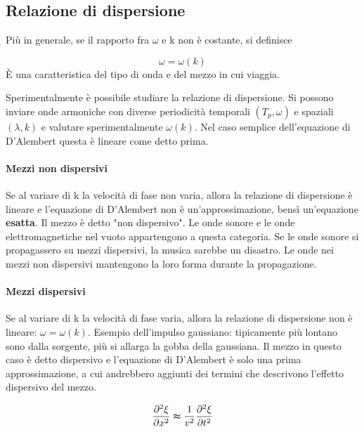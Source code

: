 \subsection{Relazione di dispersione}

Più in generale, se il rapporto fra \(\omega \) e k non è costante, si definisce

\begin{definition}
	\[
		\omega = \omega(k)
	\]
	È una caratteristica del tipo di onda e del mezzo in cui viaggia.
\end{definition}

Sperimentalmente è possibile studiare la relazione di dispersione. Si possono inviare onde armoniche con diverse periodicità temporali \((T_p, \omega )\) e spaziali \((\lambda , k)\) e valutare sperimentalmente \(\omega (k) \). Nel caso semplice dell'equazione di D'Alembert questa è lineare come detto prima.

\paragraph{Mezzi non dispersivi}

Se al variare di k la velocità di fase non varia, allora la relazione di dispersione è lineare e l'equazione di D'Alembert non è un'approssimazione, bensì un'equazione \textbf{esatta}. Il mezzo è detto "non dispersivo". Le onde sonore e le onde elettromagnetiche nel vuoto appartengono a questa categoria. Se le onde sonore si propagassero su mezzi dispersivi, la musica sarebbe un disastro. Le onde nei mezzi non dispersivi mantengono la loro forma durante la propagazione.

\paragraph{Mezzi dispersivi}

Se al variare di k la velocità di fase varia, allora la relazione di dispersione non è lineare: \(\omega = \omega(k)\). Esempio dell'impulso gaussiano: tipicamente più lontano sono dalla sorgente, più si allarga la gobba della gaussiana. Il mezzo in questo caso è detto dispersivo e l'equazione di D'Alembert è solo una prima approssimazione, a cui andrebbero aggiunti dei termini che descrivono l'effetto dispersivo del mezzo.

\[
	\frac{\partial ^{2} \xi }{\partial x^{2} } \thickapprox \frac{1}{v^{2} }\frac{\partial ^{2} \xi }{\partial t^{2} } 
\]

